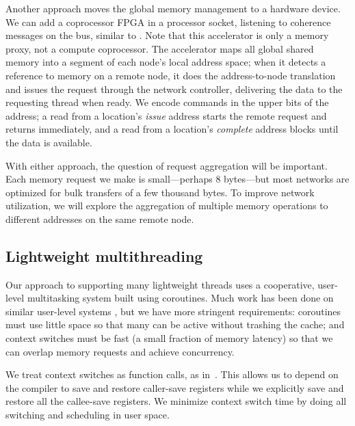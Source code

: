 \documentclass[10pt,nocopyrightspace]{sigplanconf}
\begin{document}
Another approach moves the global memory management to a hardware
device. We can add a coprocessor FPGA in a processor socket, listening
to coherence messages on the bus, similar to \cite{mogill}. Note that
this accelerator is only a memory proxy, not a compute
coprocessor. The accelerator maps all global shared memory into a
segment of each node's local address space; when it detects a
reference to memory on a remote node, it does the address-to-node
translation and issues the request through the network controller,
delivering the data to the requesting thread when ready. We 
encode commands in the upper bits of the address; a read from a
location's {\em issue} address starts the remote request and returns
immediately, and a read from a location's {\em complete} address 
blocks until the data is available.



With either approach, the question of request aggregation will be
important. Each memory request we make is small---perhaps 8
bytes---but most networks are optimized for bulk transfers of a few
thousand bytes. To improve network utilization, we will explore the
aggregation of multiple memory operations to different addresses on
the same remote node.

\subsection{Lightweight multithreading}

Our approach to supporting many lightweight threads uses a
cooperative, user-level multitasking system built using
coroutines. Much work has been done on similar user-level systems
\cite{ult,capriccio}, but we have more stringent requirements:
coroutines must use little space so that many can be active without
trashing the cache; and context switches must be fast (a small
fraction of memory latency) so that we can overlap memory requests and
achieve concurrency.

We treat context switches as function calls, as
in~\cite{charm}. This allows us to depend on the compiler to save and
restore caller-save registers while we explicitly save and restore all
the callee-save registers.  We minimize context switch time by doing
all switching and scheduling in user space.
\end{document}
